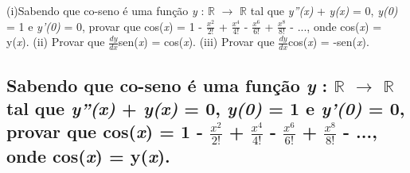 \doublespacing
(i)Sabendo que co-seno é uma função \textit{y} :  $\mathbb{R}$ $\rightarrow$  $\mathbb{R}$ tal que \textit{y''(x)} + \textit{y(x)} = 0, \textit{y(0)} = 1 e
\textit{y'(0)} = 0, provar que cos(\textit{x}) = 1 - $\frac{x^2}{2!}$ + $\frac{x^4}{4!}$ - $\frac{x^6}{6!}$ + $\frac{x^8}{8!}$ - ..., onde cos(\textit{x}) = y(\textit{x}). (ii) Provar que $\frac{dy}{dx}$sen(\textit{x}) = cos(\textit{x}). (iii) Provar que $\frac{dy}{dx}$cos(\textit{x}) = -sen(\textit{x}).


\subsection{Sabendo que co-seno é uma função \textit{y} :  $\mathbb{R}$ $\rightarrow$  $\mathbb{R}$ tal que \textit{y''(x)} + \textit{y(x)} = 0, \textit{y(0)} = 1 e
	\textit{y'(0)} = 0, provar que cos(\textit{x}) = 1 - $\frac{x^2}{2!}$ + $\frac{x^4}{4!}$ - $\frac{x^6}{6!}$ + $\frac{x^8}{8!}$ - ..., onde cos(\textit{x}) = y(\textit{x}).}

